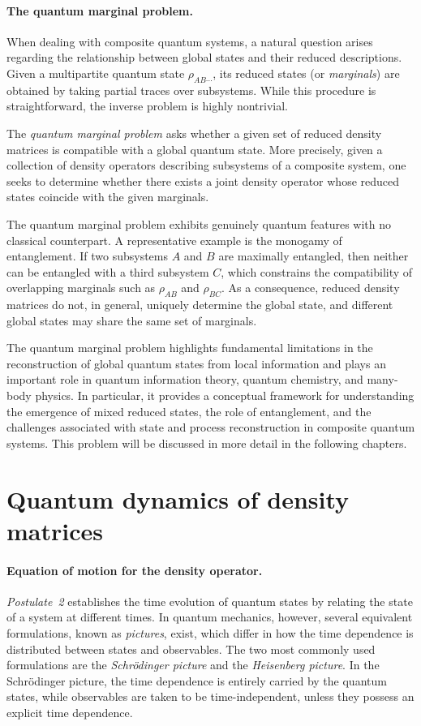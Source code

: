 \paragraph{The quantum marginal problem.}
When dealing with composite quantum systems, a natural question arises regarding the relationship between global states and their reduced descriptions. Given a multipartite quantum state $\rho_{AB\cdots}$, its reduced states (or \emph{marginals}) are obtained by taking partial traces over subsystems. While this procedure is straightforward, the inverse problem is highly nontrivial.

The \emph{quantum marginal problem} asks whether a given set of reduced density matrices is compatible with a global quantum state. More precisely, given a collection of density operators describing subsystems of a composite system, one seeks to determine whether there exists a joint density operator whose reduced states coincide with the given marginals.

The quantum marginal problem exhibits genuinely quantum features with no classical counterpart. A representative example is the monogamy of entanglement. If two subsystems $A$ and $B$ are maximally entangled, then neither can be entangled with a third subsystem $C$, which constrains the compatibility of overlapping marginals such as $\rho_{AB}$ and $\rho_{BC}$. As a consequence, reduced density matrices do not, in general, uniquely determine the global state, and different global states may share the same set of marginals.

The quantum marginal problem highlights fundamental limitations in the reconstruction of global quantum states from local information and plays an important role in quantum information theory, quantum chemistry, and many-body physics. In particular, it provides a conceptual framework for understanding the emergence of mixed reduced states, the role of entanglement, and the challenges associated with state and process reconstruction in composite quantum systems. This problem will be discussed in more detail in the following chapters.

\section{Quantum dynamics of density matrices}
\label{sec:quantum-dynamics}

\paragraph{Equation of motion for the density operator.}
\textit{Postulate~2} establishes the time evolution of quantum states by relating the state of a system at different times.
In quantum mechanics, however, several equivalent formulations, known as \textit{pictures}, exist, which differ in how the time dependence is distributed between states and observables.
The two most commonly used formulations are the \textit{Schrödinger picture} and the \textit{Heisenberg picture}.
In the Schrödinger picture, the time dependence is entirely carried by the quantum states, while observables are taken to be time-independent, unless they possess an explicit time dependence.

